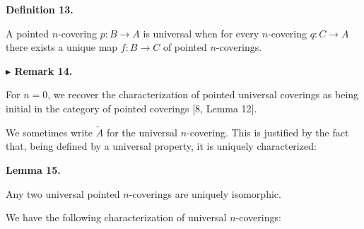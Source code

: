  
 
\par\medskip\noindent\textbf{Definition 13.}\par
 
 
A pointed $n$-covering $p:B\to A$ is universal when for every $n$-covering $q:C\to A$ there exists a unique map $f:B\to C$ of pointed $n$-coverings.\par
 
 
 
 
\par\medskip\noindent\textbf{$\blacktriangleright$ Remark 14.}\par
 
 
For $n=0$, we recover the characterization of pointed universal coverings as being initial in the category of pointed coverings [8, Lemma 12].\par
 
 
 
 
We sometimes write $\tilde{A}$ for the universal $n$-covering. This is justified by the fact that, being defined by a universal property, it is uniquely characterized:\par
 
 
 
\par\medskip\noindent\textbf{Lemma 15.}\par
 
 
Any two universal pointed $n$-coverings are uniquely isomorphic.\par
 
 
 
 
We have the following characterization of universal $n$-coverings:\par
 
 
